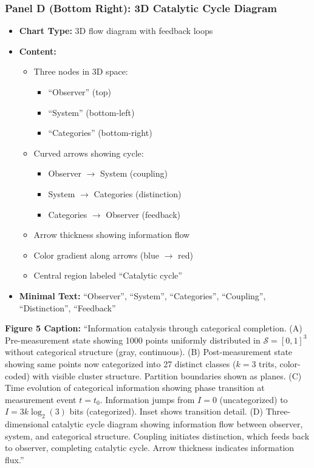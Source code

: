 \subsubsection*{Panel D (Bottom Right): 3D Catalytic Cycle Diagram}
\begin{itemize}
\item \textbf{Chart Type:} 3D flow diagram with feedback loops
\item \textbf{Content:}
  \begin{itemize}
  \item Three nodes in 3D space:
    \begin{itemize}
    \item ``Observer'' (top)
    \item ``System'' (bottom-left)
    \item ``Categories'' (bottom-right)
    \end{itemize}
  \item Curved arrows showing cycle:
    \begin{itemize}
    \item Observer $\to$ System (coupling)
    \item System $\to$ Categories (distinction)
    \item Categories $\to$ Observer (feedback)
    \end{itemize}
  \item Arrow thickness showing information flow
  \item Color gradient along arrows (blue $\to$ red)
  \item Central region labeled ``Catalytic cycle''
  \end{itemize}
\item \textbf{Minimal Text:} ``Observer'', ``System'', ``Categories'', ``Coupling'', ``Distinction'', ``Feedback''
\end{itemize}

\textbf{Figure 5 Caption:}
``Information catalysis through categorical completion. (A) Pre-measurement state showing 1000 points uniformly distributed in $\mathcal{S}=[0,1]^3$ without categorical structure (gray, continuous). (B) Post-measurement state showing same points now categorized into 27 distinct classes ($k=3$ trits, color-coded) with visible cluster structure. Partition boundaries shown as planes. (C) Time evolution of categorical information showing phase transition at measurement event $t=t_0$. Information jumps from $I=0$ (uncategorized) to $I=3k \log_2(3)$ bits (categorized). Inset shows transition detail. (D) Three-dimensional catalytic cycle diagram showing information flow between observer, system, and categorical structure. Coupling initiates distinction, which feeds back to observer, completing catalytic cycle. Arrow thickness indicates information flux.''

